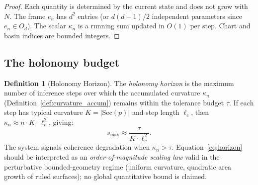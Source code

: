\documentclass[11pt,a4paper]{article}
\theoremstyle{definition}
\newtheorem{definition}[theorem]{Definition}
\theoremstyle{remark}
\newcommand{\Sec}{\mathrm{Sec}}
\begin{document}
\begin{proof}
Each quantity is determined by the current state and does not grow 
with $N$. The frame $e_n$ has $d^2$ entries (or $d(d-1)/2$ 
independent parameters since $e_n \in O_d$). The scalar $\kappa_n$ 
is a running sum updated in $O(1)$ per step. Chart and basin 
indices are bounded integers.
\end{proof}

\subsection{The holonomy budget}\label{sec:holonomy_budget}

\begin{definition}[Holonomy Horizon]\label{def:horizon}
The \emph{holonomy horizon} is the maximum number of inference 
steps over which the accumulated curvature $\kappa_n$ 
(Definition~\ref{def:curvature_accum}) remains within the 
tolerance budget $\tau$. If each step has typical curvature 
$K = |\Sec(p)|$ and step length $\ell_c$, then 
$\kappa_n \approx n \cdot K \cdot \ell_c^2$, giving:
\begin{equation}\label{eq:horizon}
    s_{\max} \approx \frac{\tau}{K \cdot \ell_c^2}.
\end{equation}
The system signals coherence degradation when $\kappa_n > \tau$. 
Equation~\eqref{eq:horizon} should be interpreted as an 
\emph{order-of-magnitude scaling law} valid in the perturbative 
bounded-geometry regime (uniform curvature, quadratic area growth 
of ruled surfaces); no global quantitative bound is claimed.
\end{definition}
\end{document}
